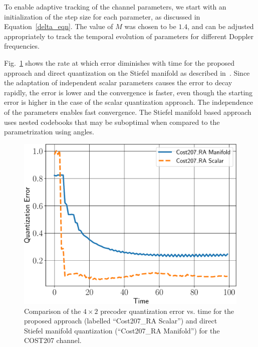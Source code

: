 \documentclass[journal,10pt,twocolumn]{IEEEtran}
\def\imwidth{0.65}
\begin{document}
To enable adaptive tracking of the channel parameters, we start with
an initialization of the step size for each parameter, as discussed in
Equation~\ref{delta_eqn}. The value of $M$ was chosen to be $1.4$, and
can be adjusted appropriately to track the temporal evolution of
parameters for different Doppler frequencies.

Fig.~\ref{fig:error_decay} shows the rate at which error diminishes
with time for the proposed approach and direct quantization on the
Stiefel manifold as described in~\cite{Gupt1905:Predictive}. Since the
adaptation of independent scalar parameters causes the error to decay
rapidly, the error is lower and the convergence is faster, even though
the starting error is higher in the case of the scalar quantization
approach. The independence of the parameters enables fast
convergence. The Stiefel manifold based approach uses nested codebooks
that may be suboptimal when compared to the parametrization using
angles.

\begin{figure}
\begin{center}
\includegraphics[width=\imwidth\columnwidth]{images/qerror.pdf}
\caption{\label{fig:error_decay}Comparison of the $4\times 2$
  precoder quantization error vs. time for the proposed
  approach (labelled ``Cost207\_RA Scalar'') and direct Stiefel
  manifold quantization (``Cost207\_RA Manifold'') for the COST207 channel.}
\end{center}
\end{figure}
\end{document}
